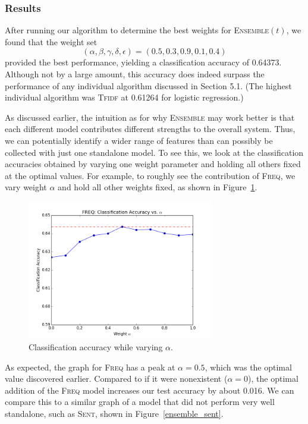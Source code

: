 \documentclass[11pt]{article}
\begin{document}
\subsubsection{Results}

After running our algorithm to determine the best weights for \textsc{Ensemble}$(t)$, we found that the weight set
\[ (\alpha,\beta,\gamma,\delta,\epsilon) = (0.5, 0.3, 0.9, 0.1, 0.4) \]
provided the best performance, yielding a classification accuracy of 0.64373. Although not by a large amount, this accuracy does indeed surpass the performance of any individual algorithm discussed in Section 5.1. (The highest individual algorithm was \textsc{Tfidf} at 0.61264 for logistic regression.)

As discussed earlier, the intuition as for why \textsc{Ensemble} may work better is that each different model contributes different strengths to the overall system. Thus, we can potentially identify a wider range of features than can possibly be collected with just one standalone model. To see this, we look at the classification accuracies obtained by varying one weight parameter and holding all others fixed at the optimal values. For example, to roughly see the contribution of \textsc{Freq}, we vary weight $\alpha$ and hold all other weights fixed, as shown in Figure~\ref{ensemble_freq}.

\begin{figure}[h]
  \centering
    \includegraphics[width=3.2in]{ensemble_freq.png}
  \caption{Classification accuracy while varying $\alpha$.}
  \label{ensemble_freq}
\end{figure}

As expected, the graph for \textsc{Freq} has a peak at $\alpha=0.5$, which was the optimal value discovered earlier. Compared to if it were nonexistent ($\alpha=0$), the optimal addition of the \textsc{Freq} model increases our test accuracy by about 0.016. We can compare this to a similar graph of a model that did not perform very well standalone, such as \textsc{Sent}, shown in Figure~\ref{ensemble_sent}.
\end{document}
